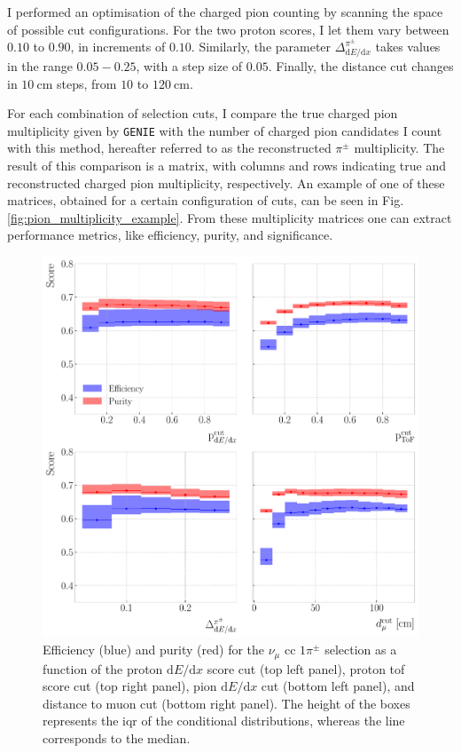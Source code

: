 I performed an optimisation of the charged pion counting by scanning the space of possible cut configurations. For the two proton scores, I let them vary between $0.10$ to $0.90$, in increments of $0.10$. Similarly, the parameter $\Delta^{\pi^{\pm}}_{\mathrm{d}E/\mathrm{d}x}$ takes values in the range $0.05-0.25$, with a step size of $0.05$. Finally, the distance cut changes in $10~\mathrm{cm}$ steps, from $10$ to $120~\mathrm{cm}$.

For each combination of selection cuts, I compare the true charged pion multiplicity given by \texttt{GENIE} with the number of charged pion candidates I count with this method, hereafter referred to as the reconstructed $\pi^{\pm}$ multiplicity. The result of this comparison is a matrix, with columns and rows indicating true and reconstructed charged pion multiplicity, respectively. An example of one of these matrices, obtained for a certain configuration of cuts, can be seen in Fig. \ref{fig:pion_multiplicity_example}. From these multiplicity matrices one can extract performance metrics, like efficiency, purity, and significance.

\begin{figure}[t]
    \centering
    \includegraphics[width=.85\linewidth]{Images/GAr_selection/pion_selection_1_pions_metrics.pdf}
    \caption[Efficiency and purity for the $\nu_{\mu}$ \gls{cc} $1\pi^{\pm}$ selection as a function of the different cuts.]{Efficiency (blue) and purity (red) for the $\nu_{\mu}$ \gls{cc} $1\pi^{\pm}$ selection as a function of the proton $\mathrm{d}E/\mathrm{d}x$ score cut (top left panel), proton \gls{tof} score cut (top right panel), pion $\mathrm{d}E/\mathrm{d}x$ cut (bottom left panel), and distance to muon cut (bottom right panel). The height of the boxes represents the \gls{iqr} of the conditional distributions, whereas the line corresponds to the median.}
    \label{fig:pion_selection_1_pions_metrics}
\end{figure}

